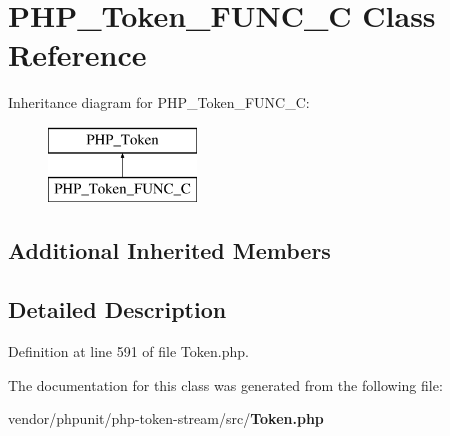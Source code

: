 \section{P\+H\+P\+\_\+\+Token\+\_\+\+F\+U\+N\+C\+\_\+\+C Class Reference}
\label{class_p_h_p___token___f_u_n_c___c}
Inheritance diagram for P\+H\+P\+\_\+\+Token\+\_\+\+F\+U\+N\+C\+\_\+\+C\+:\begin{figure}[H]
\begin{center}
\leavevmode
\includegraphics[height=2.000000cm]{class_p_h_p___token___f_u_n_c___c}
\end{center}
\end{figure}
\subsection*{Additional Inherited Members}


\subsection{Detailed Description}


Definition at line 591 of file Token.\+php.



The documentation for this class was generated from the following file\+:\begin{DoxyCompactItemize}
\item 
vendor/phpunit/php-\/token-\/stream/src/{\bf Token.\+php}\end{DoxyCompactItemize}
